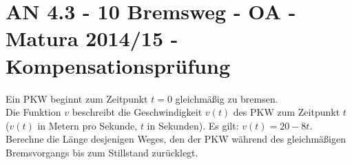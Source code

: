 \section{AN 4.3 - 10 Bremsweg - OA - Matura 2014/15 - Kompensationsprüfung}

\begin{beispiel}[AN 4.3]{1} %
Ein PKW beginnt zum Zeitpunkt $t=0$ gleichmäßig zu bremsen.\\
Die Funktion $v$ beschreibt die Geschwindigkeit $v(t)$ des PKW zum Zeitpunkt $t$ ($v(t)$ in Metern pro Sekunde, $t$ in Sekunden). Es gilt: $v(t)=20-8t$.\\

Berechne die Länge desjenigen Weges, den der PKW während des gleichmäßigen Bremsvorgangs bis zum Stillstand zurücklegt.\\

\end{beispiel}